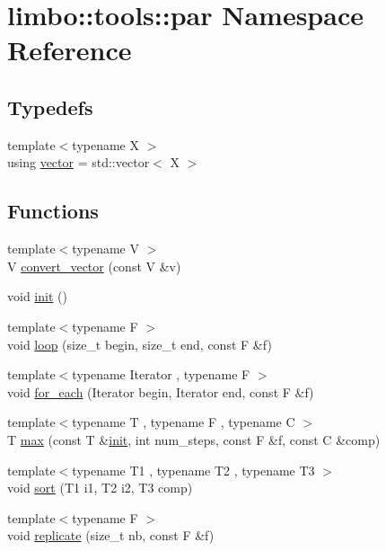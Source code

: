 \hypertarget{namespacelimbo_1_1tools_1_1par}{}\section{limbo\+:\+:tools\+:\+:par Namespace Reference}
\label{namespacelimbo_1_1tools_1_1par}
\subsection*{Typedefs}
\begin{DoxyCompactItemize}
\item 
{\footnotesize template$<$typename X $>$ }\\using \hyperlink{namespacelimbo_1_1tools_1_1par_af51cb7a6b55652377e2553e6de65b948}{vector} = std\+::vector$<$ X $>$
\end{DoxyCompactItemize}
\subsection*{Functions}
\begin{DoxyCompactItemize}
\item 
{\footnotesize template$<$typename V $>$ }\\V \hyperlink{namespacelimbo_1_1tools_1_1par_ae84275467a83e81f3201ce512c178c9c}{convert\+\_\+vector} (const V \&v)
\item 
void \hyperlink{group__par__tools_ga1d650a019b6c1bb551cb42f1c3f5ef82}{init} ()
\item 
{\footnotesize template$<$typename F $>$ }\\void \hyperlink{group__par__tools_ga0e0d97b2a06005eac32290a846ccef91}{loop} (size\+\_\+t begin, size\+\_\+t end, const F \&f)
\item 
{\footnotesize template$<$typename Iterator , typename F $>$ }\\void \hyperlink{group__par__tools_gaa7bbb8a640ed2b66101d57b5b565457f}{for\+\_\+each} (Iterator begin, Iterator end, const F \&f)
\item 
{\footnotesize template$<$typename T , typename F , typename C $>$ }\\T \hyperlink{group__par__tools_gaf3fdc36fc4e94ad4cac72c803234b6ac}{max} (const T \&\hyperlink{group__par__tools_ga1d650a019b6c1bb551cb42f1c3f5ef82}{init}, int num\+\_\+steps, const F \&f, const C \&comp)
\item 
{\footnotesize template$<$typename T1 , typename T2 , typename T3 $>$ }\\void \hyperlink{group__par__tools_gab29bca0dac2a8917b8447bc52d376f1c}{sort} (T1 i1, T2 i2, T3 comp)
\item 
{\footnotesize template$<$typename F $>$ }\\void \hyperlink{group__par__tools_gade6005a5ea74ca5203203d30210c0f22}{replicate} (size\+\_\+t nb, const F \&f)
\end{DoxyCompactItemize}


